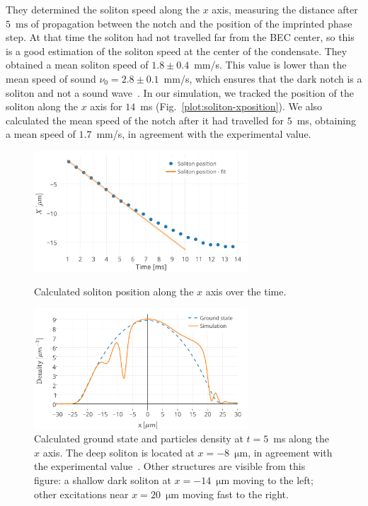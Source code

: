 They determined the soliton speed along the $x$ axis, measuring the distance after $5 $~$ \mathrm{ms}$ of propagation between the notch and the position of the imprinted phase step. At that time the soliton had not travelled far from the BEC center, so this is a good estimation of the soliton speed at the center of the condensate. They obtained a mean soliton speed of  $1.8 \pm 0.4$~mm/s. This value is lower than the mean speed of sound $\nu_0 = 2.8 \pm 0.1$~mm/s, which ensures that the dark notch is a soliton and not a sound wave~\citep{DSF00}. In our simulation, we tracked the position of the soliton along the $x$ axis for $14$~ms (Fig.~\ref{plot:soliton-xposition}). We also calculated the mean speed of the notch after it had travelled for $5$~ms, obtaining a mean speed of $1.7$~mm/s, in agreement with the experimental value.
\begin{figure}[h!]
    \centering
	\includegraphics[width=8cm]{Plots/soliton_track.pdf}
	\caption{Calculated soliton position along the $x$ axis over the time.} \label{plot:soliton-xposition}
	\includegraphics[width=8cm]{Plots/density_xprofile_5ms.pdf}
	\caption{Calculated ground state and particles density at $t = 5$~ms along the $x$ axis. The deep soliton is located at $x = -8 $~$ \mathrm{\mu m}$, in agreement with the experimental value~\citep{DSF00}. Other structures are visible from this figure: a shallow  dark soliton at $x = -14 $~$ \mathrm{\mu m}$ moving to the left; other excitations near $x = 20 $~$ \mathrm{\mu m}$ moving fast to the right.} \label{plot:density_5ms}
\end{figure}


